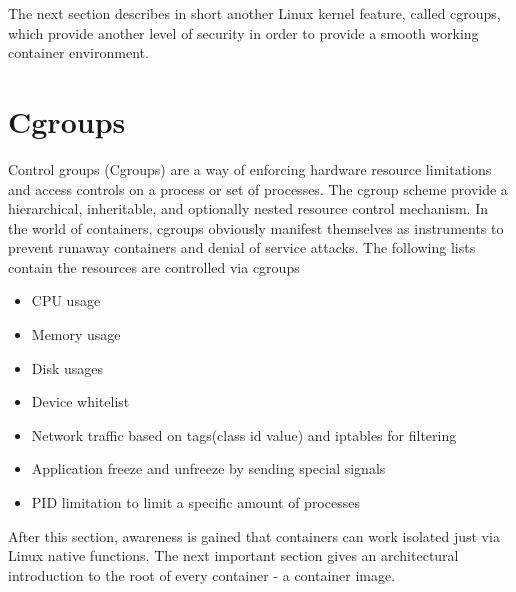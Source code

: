 The next section describes in short another Linux kernel feature, called cgroups, which provide another level of security in order to provide a smooth working container environment.

\section{Cgroups}
\label{sec:intro:containerization:cgroups}
Control groups (Cgroups) are a way of enforcing hardware resource limitations and access controls on a process or set of processes. The cgroup scheme provide a hierarchical, inheritable, and optionally nested resource control mechanism.
In the world of containers, cgroups obviously manifest themselves as instruments to prevent runaway containers and denial of service attacks.
The following lists contain the resources are controlled via cgroups

\begin{itemize}
\item CPU usage
\item Memory usage
\item Disk usages
\item Device whitelist
\item Network traffic based on tags(class id value) and iptables for filtering
\item Application freeze and unfreeze by sending special signals
\item PID limitation to limit a specific amount of processes 
\end{itemize}

After this section, awareness is gained that containers can work isolated just via Linux native functions.
The next important section gives an architectural introduction to the root of every container - a container image.
